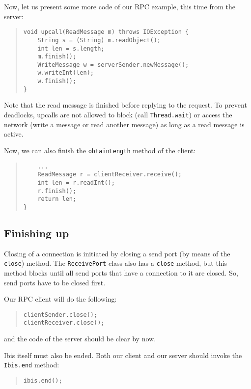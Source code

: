 \documentclass[10pt]{article}
\begin{document}
Now, let us present some more code of our RPC example, this time
from the server:

\begin{quote}
\begin{verbatim}
void upcall(ReadMessage m) throws IOException {
    String s = (String) m.readObject();
    int len = s.length;
    m.finish();
    WriteMessage w = serverSender.newMessage();
    w.writeInt(len);
    w.finish();
}
\end{verbatim}
\end{quote}

Note that the read message is finished before replying to the
request. To prevent deadlocks, upcalls are not allowed to block
(call \texttt{Thread.wait}) or access the network (write a message or
read another message) as long as a read message is active.

Now, we can also finish the \verb+obtainLength+ method of the client:
\begin{quote}
\begin{verbatim}
    ...
    ReadMessage r = clientReceiver.receive();
    int len = r.readInt();
    r.finish();
    return len;
}
\end{verbatim}
\end{quote}

\subsection{Finishing up}

Closing of a connection is initiated by closing a send port
(by means of the \verb+close+) method. The \verb+ReceivePort+
class also has a \verb+close+ method, but this method blocks
until all send ports that have a connection to it are closed.
So, send ports have to be closed first.

Our RPC client will do the following:

\begin{quote}
\begin{verbatim}
clientSender.close();
clientReceiver.close();
\end{verbatim}
\end{quote}
and the code of the server should be clear by now.

Ibis itself must also be ended. Both our client and our server
should invoke the \verb+Ibis.end+ method:
\begin{quote}
\begin{verbatim}
ibis.end();
\end{verbatim}
\end{quote}
\end{document}
